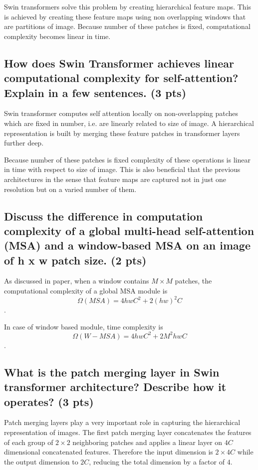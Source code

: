 \documentclass{article}
\begin{document}
Swin transformers solve this problem by creating hierarchical feature maps. This is achieved by creating these feature maps using non overlapping windows that are partitions of image. Because number of these patches is fixed, computational complexity becomes linear in time.

\subsection{How does Swin Transformer achieves linear computational complexity for self-attention? Explain in a few sentences.  (3 pts)}

Swin transformer computes self attention locally on non-overlapping patches which are fixed in number, i.e. are linearly related to size of image. A hierarchical representation is built by merging these feature patches in transformer layers further deep. 

Because number of these patches is fixed complexity of these operations is linear in time with respect to size of image. This is also beneficial that the previous architectures in the sense that feature maps are captured not in just one resolution but on a varied number of them.

\subsection{Discuss the difference in computation complexity of a global multi-head self-attention (MSA) and a window-based MSA on an image of h x w patch size. (2 pts)}

As discussed in paper, when a window contains $M\times M$ patches, the computational complexity of a global MSA module is $$\Omega(MSA) =4hwC^2+2(hw)^2C$$.

In case of window based module, time complexity is $$\Omega(W-MSA)=4hwC^2+2M^2hwC$$. %

\subsection{What is the patch merging layer in Swin transformer architecture? Describe how it operates? (3 pts)}

Patch merging layers play a very important role in capturing the hierarchical representation of images. The first patch merging layer concatenates the features of each group of $2\times 2$ neighboring patches and applies a linear layer on $4C$ dimensional concatenated features. Therefore the input dimension is $2 \times 4 C$ while the output dimension to $2C$, reducing the total dimension by a factor of $4$.
\end{document}
